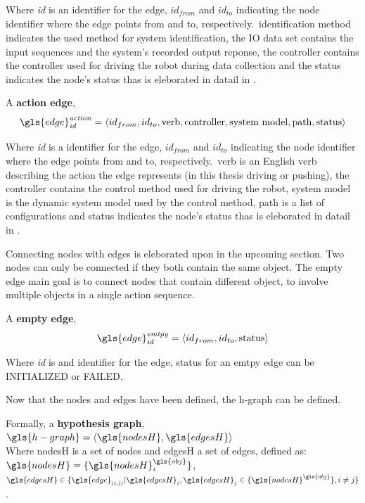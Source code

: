 Where \textit{id} is an identifier for the edge, $\mathit{id_{from}}$ and $\mathit{id_{to}}$ indicating the node identifier where the edge points from and to, respectively.~identification method indicates the used method for system identification, the \textrm{\ac{IO} data set} contains the input sequences and the system's recorded output reponse, the controller contains the controller used for driving the robot during data collection and the status indicates the node's status thas is eleborated in datail in .\bs

A \textbf{action edge}, \[\gls{edge}^\mathit{action}_\mathit{id} = \left\langle id_{from}, id_{to}, \textrm{verb}, \textrm{controller},\textrm{system model}, \textrm{path}, \textrm{status} \right\rangle\]\bs

Where \textit{id} is a identifier for the edge, $\mathit{id_{from}}$ and $\mathit{id_{to}}$ indicating the node identifier where the edge points from and to, respectively.~verb is an English verb describing the action the edge represents (in this thesis driving or pushing), the controller contains the control method used for driving the robot, system model is the dynamic system model used by the control method, path is a list of configurations and status indicates the node's status thas is eleborated in datail in .\bs

Connecting nodes with edges is eleborated upon in the upcoming section. Two nodes can only be connected if they both contain the same object. The empty edge main goal is to connect nodes that contain different object, to involve multiple objects in a single action sequence.\bs

A \textbf{empty edge}, \[\gls{edge}^\mathit{emtpy}_\mathit{id} = \left\langle id_{from}, id_{to}, \textrm{status} \right\rangle\]\bs

Where \textit{id} is and identifier for the edge, status for an emtpy edge can be INITIALIZED or FAILED.\bs

Now that the nodes and edges have been defined, the \ac{h-graph} can be defined.\bs

Formally, a \textbf{hypothesis graph}, $\gls{h-graph} = \left\langle \gls{nodesH}, \gls{edgesH} \right\rangle $
\\ Where \gls{nodesH} is a set of nodes and \gls{edgesH} a set of edges, defined as: $\gls{nodesH} = \{\gls{nodesH}^{\gls{obj}}_{i}\}$, \quad $\gls{edgesH} \in \{\gls{edge}_{(i,j)}| \gls{edgesH}_i, \gls{edgesH}_j \in \{\gls{nodesH}^{\gls{obj}} \}, i \neq j\}$.\bs


